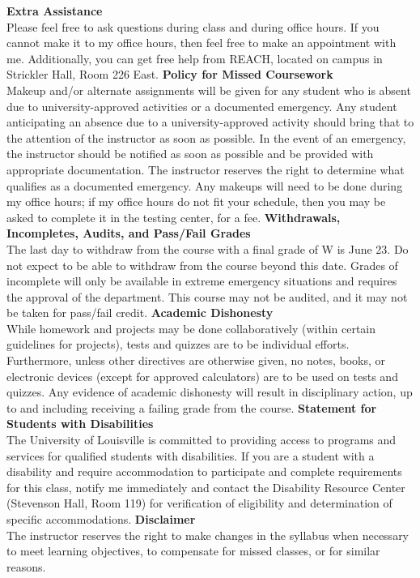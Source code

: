 \documentclass[addpoints,12pt]{exam}
\begin{document}
\wl
\noindent \textbf{Extra Assistance} \\
Please feel free to ask questions during class and during office hours. If you cannot make it to my office hours, then feel free to make an appointment with me. Additionally, you can get free help from REACH, located on campus in Strickler Hall, Room 226 East.
\wl
\noindent \textbf{Policy for Missed Coursework} \\
Makeup and/or alternate assignments will be given for any student who is absent due to university-approved activities or a documented emergency. Any student anticipating an absence due to a university-approved activity should bring that to the attention of the instructor as soon as possible. In the event of an emergency, the instructor should be notified as soon as possible and be provided with appropriate documentation. The instructor reserves the right to determine what qualifies as a documented emergency. Any makeups will need to be done during my office hours; if my office hours do not fit your schedule, then you may be asked to complete it in the testing center, for a fee.
\wl
\noindent \textbf{Withdrawals, Incompletes, Audits, and Pass/Fail Grades} \\
The last day to withdraw from the course with a final grade of W is June 23. Do not expect to be able to withdraw from the course beyond this date. Grades of incomplete will only be available in extreme emergency situations and requires the approval of the department. This course may not be audited, and it may not be taken for pass/fail credit. 
\wl
\noindent \textbf{Academic Dishonesty} \\
While homework and projects may be done collaboratively (within certain guidelines for projects), tests and quizzes are to be individual efforts. Furthermore, unless other directives are otherwise given, no notes, books, or electronic devices (except for approved calculators) are to be used on tests and quizzes. Any evidence of academic dishonesty will result in disciplinary action, up to and including receiving a failing grade from the course.
\wl
\noindent \textbf{Statement for Students with Disabilities} \\
The University of Louisville is committed to providing access to programs and services for qualified students with disabilities. If you are a student with a disability and require accommodation to participate and complete requirements for this class, notify me immediately and contact the Disability Resource Center (Stevenson Hall, Room 119) for verification of eligibility and determination of specific accommodations.
\wl
\noindent \textbf{Disclaimer} \\
The instructor reserves the right to make changes in the syllabus when necessary to meet learning objectives, to compensate for missed classes, or for similar reasons.
\newpage
\end{document}
